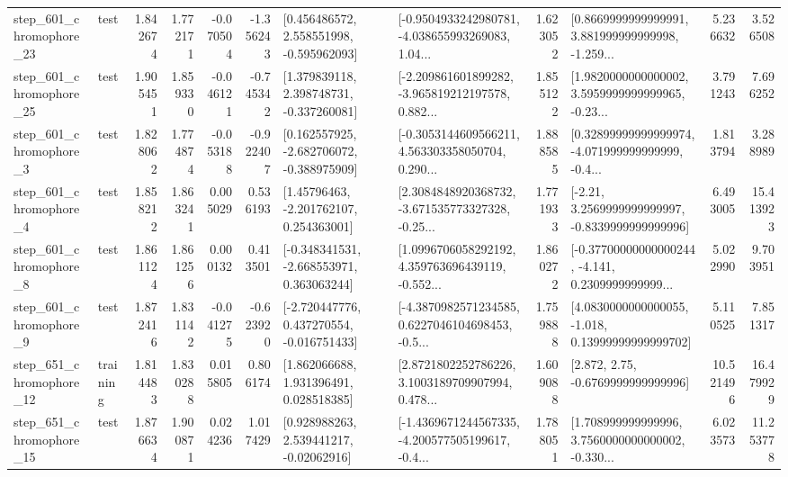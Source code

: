 \begin{tabular}{llrrrrllrlrr}
  step\_601\_chromophore\_23 &      test &      1.842674 &    1.772171 &     -0.070504 & -1.356243 &    [0.456486572, 2.558551998, -0.595962093] &  [-0.9504933242980781, -4.038655993269083, 1.04... &       1.623052 &  [0.8669999999999991, 3.881999999999998, -1.259... &            5.236632 &          3.526508 \\
  step\_601\_chromophore\_25 &      test &      1.905451 &    1.859330 &     -0.046121 & -0.745342 &    [1.379839118, 2.398748731, -0.337260081] &  [-2.209861601899282, -3.965819212197578, 0.882... &       1.855122 &  [1.9820000000000002, 3.5959999999999965, -0.23... &            3.791243 &          7.696252 \\
   step\_601\_chromophore\_3 &      test &      1.828062 &    1.774874 &     -0.053188 & -0.922407 &   [0.162557925, -2.682706072, -0.388975909] &  [-0.3053144609566211, 4.563303358050704, 0.290... &       1.888585 &  [0.32899999999999974, -4.071999999999999, -0.4... &            1.813794 &          3.288989 \\
   step\_601\_chromophore\_4 &      test &      1.858212 &    1.863241 &      0.005029 &  0.536193 &     [1.45796463, -2.201762107, 0.254363001] &  [2.3084848920368732, -3.671535773327328, -0.25... &       1.771933 &   [-2.21, 3.2569999999999997, -0.8339999999999996] &            6.493005 &         15.413923 \\
   step\_601\_chromophore\_8 &      test &      1.861124 &    1.861256 &      0.000132 &  0.413501 &   [-0.348341531, -2.668553971, 0.363063244] &  [1.0996706058292192, 4.359763696439119, -0.552... &       1.860272 &  [-0.37700000000000244, -4.141, 0.2309999999999... &            5.022990 &          9.703951 \\
   step\_601\_chromophore\_9 &      test &      1.872416 &    1.831142 &     -0.041275 & -0.623920 &   [-2.720447776, 0.437270554, -0.016751433] &  [-4.3870982571234585, 0.6227046104698453, -0.5... &       1.759888 &  [4.0830000000000055, -1.018, 0.13999999999999702] &            5.110525 &          7.851317 \\
  step\_651\_chromophore\_12 &  training &      1.814483 &    1.830288 &      0.015805 &  0.806174 &     [1.862066688, 1.931396491, 0.028518385] &  [2.8721802252786226, 3.1003189709907994, 0.478... &       1.609088 &                 [2.872, 2.75, -0.6769999999999996] &           10.521496 &         16.479929 \\
  step\_651\_chromophore\_15 &      test &      1.876634 &    1.900871 &      0.024236 &  1.017429 &     [0.928988263, 2.539441217, -0.02062916] &  [-1.4369671244567335, -4.200577505199617, -0.4... &       1.788051 &  [1.708999999999996, 3.7560000000000002, -0.330... &            6.023573 &         11.253778 \\

\end{tabular}
